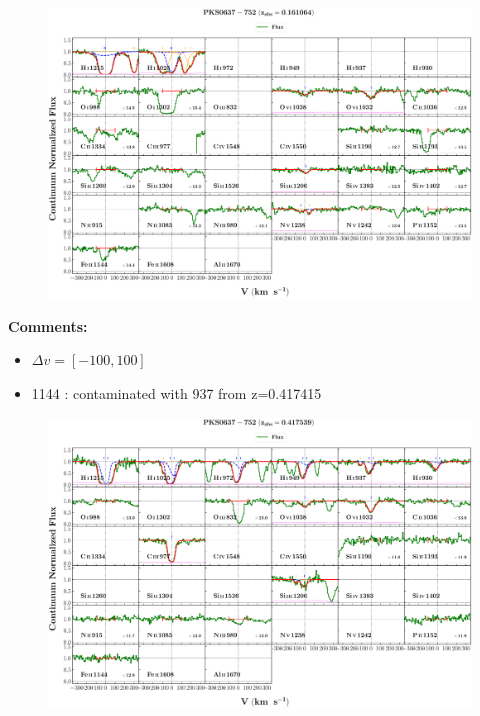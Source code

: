 \documentclass[12pt]{report}
\newcommand\ion[2]{\text{#1\,\textsc{\lowercase{#2}}}}
\begin{document}
\begin{landscape}

    \begin{figure}
    \centering
    \vspace{-20mm}
    \hspace*{-35mm}
    \includegraphics[width=1.25\linewidth]{sys_plots_full/PKS0637-752_z=0.161064_sys_plot_full.png}
    \end{figure}
    
\end{landscape}

\textbf{Comments:}

\begin{itemize}
    \item $\Delta v = [-100,100]$
    \item \ion{Fe}{ii} 1144 : contaminated with \ion{H}{i} 937 from z=0.417415
\end{itemize}


\begin{landscape}

    \begin{figure}
    \centering
    \vspace{-20mm}
    \hspace*{-35mm}
    \includegraphics[width=1.25\linewidth]{sys_plots_full/PKS0637-752_z=0.417539_sys_plot_full.png}
    \end{figure}
    
\end{landscape}
\end{document}
